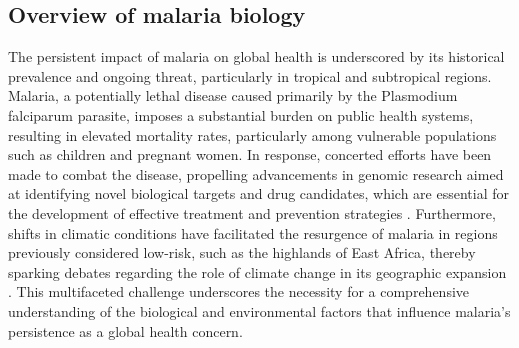 \subsection{Overview of malaria biology}
The persistent impact of malaria on global health is underscored by its historical prevalence and ongoing threat, particularly in tropical and subtropical regions. Malaria, a potentially lethal disease caused primarily by the Plasmodium falciparum parasite, imposes a substantial burden on public health systems, resulting in elevated mortality rates, particularly among vulnerable populations such as children and pregnant women. In response, concerted efforts have been made to combat the disease, propelling advancements in genomic research aimed at identifying novel biological targets and drug candidates, which are essential for the development of effective treatment and prevention strategies \cite{Birkholtz2006}. Furthermore, shifts in climatic conditions have facilitated the resurgence of malaria in regions previously considered low-risk, such as the highlands of East Africa, thereby sparking debates regarding the role of climate change in its geographic expansion \cite{Chaves2010}. This multifaceted challenge underscores the necessity for a comprehensive understanding of the biological and environmental factors that influence malaria's persistence as a global health concern.

